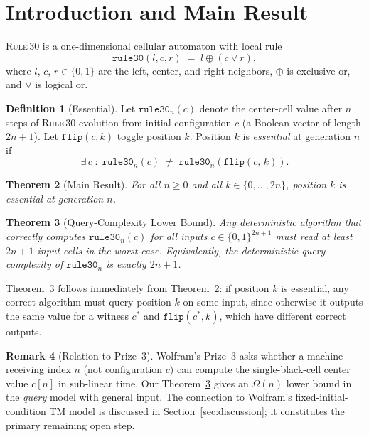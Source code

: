 \documentclass[11pt]{article}
\theoremstyle{plain}
\newtheorem{theorem}{Theorem}[section]
\theoremstyle{definition}
\newtheorem{definition}[theorem]{Definition}
\newtheorem{remark}[theorem]{Remark}
\newcommand{\rthirty}{\textsc{Rule\,30}}
\begin{document}
\section{Introduction and Main Result}

\rthirty{} is a one-dimensional cellular automaton with local rule
\begin{equation}
  \label{eq:rule30}
  \mathtt{rule30}(l, c, r) \;=\; l \oplus (c \lor r),
\end{equation}
where $l$, $c$, $r \in \{0,1\}$ are the left, center, and right neighbors, $\oplus$
is exclusive-or, and $\lor$ is logical or.

\begin{definition}[Essential]
\label{def:essential}
Let $\mathtt{rule30}_n(c)$ denote the center-cell value after $n$ steps of \rthirty{}
evolution from initial configuration $c$ (a Boolean vector of length $2n+1$).  Let
$\mathtt{flip}(c, k)$ toggle position $k$.  Position $k$ is \emph{essential} at
generation $n$ if
\[
  \exists\, c \;:\; \mathtt{rule30}_n(c) \;\neq\; \mathtt{rule30}_n(\mathtt{flip}(c,\,k)).
\]
\end{definition}

\begin{theorem}[Main Result]
\label{thm:main}
For all $n \geq 0$ and all $k \in \{0, \ldots, 2n\}$, position $k$ is essential at
generation $n$.
\end{theorem}

\begin{theorem}[Query-Complexity Lower Bound]
\label{thm:querycomplexity}
Any deterministic algorithm that correctly computes $\mathtt{rule30}_n(c)$ for all
inputs $c \in \{0,1\}^{2n+1}$ must read at least $2n+1$ input cells in the worst
case.  Equivalently, the deterministic query complexity of $\mathtt{rule30}_n$ is
exactly $2n+1$.
\end{theorem}

Theorem~\ref{thm:querycomplexity} follows immediately from Theorem~\ref{thm:main}: if
position $k$ is essential, any correct algorithm must query position $k$ on some
input, since otherwise it outputs the same value for a witness $c^*$ and
$\mathtt{flip}(c^*, k)$, which have different correct outputs.

\begin{remark}[Relation to Prize~3]
\label{rem:prize3}
Wolfram's Prize~3 asks whether a machine receiving index $n$ (not configuration $c$)
can compute the single-black-cell center value $c[n]$ in sub-linear time.  Our
Theorem~\ref{thm:querycomplexity} gives an $\Omega(n)$ lower bound in the
\emph{query} model with general input.  The connection to Wolfram's fixed-initial-condition
TM model is discussed in Section~\ref{sec:discussion}; it constitutes the primary
remaining open step.
\end{remark}
\end{document}

